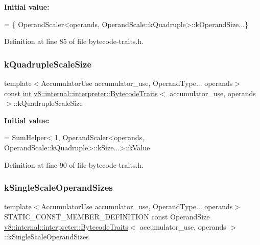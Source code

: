 {\bfseries Initial value\+:}
\begin{DoxyCode}
= \{
    OperandScaler<operands, OperandScale::kQuadruple>::kOperandSize...\}
\end{DoxyCode}


Definition at line 85 of file bytecode-\/traits.\+h.

\mbox{\label{structv8_1_1internal_1_1interpreter_1_1BytecodeTraits_a9e8702dbbdd38b628e7a21dd646c6747}} 
\subsubsection{\texorpdfstring{k\+Quadruple\+Scale\+Size}{kQuadrupleScaleSize}}
{\footnotesize\ttfamily template$<$Accumulator\+Use accumulator\+\_\+use, Operand\+Type... operands$>$ \\
const \mbox{\hyperlink{classint}{int}} \mbox{\hyperlink{structv8_1_1internal_1_1interpreter_1_1BytecodeTraits}{v8\+::internal\+::interpreter\+::\+Bytecode\+Traits}}$<$ accumulator\+\_\+use, operands $>$\+::k\+Quadruple\+Scale\+Size\hspace{0.3cm}{\ttfamily [static]}}

{\bfseries Initial value\+:}
\begin{DoxyCode}
= SumHelper<
      1, OperandScaler<operands, OperandScale::kQuadruple>::kSize...>::kValue
\end{DoxyCode}


Definition at line 90 of file bytecode-\/traits.\+h.

\mbox{\label{structv8_1_1internal_1_1interpreter_1_1BytecodeTraits_abcaf2b595c3970826dbe7abe30c7ebe6}} 
\subsubsection{\texorpdfstring{k\+Single\+Scale\+Operand\+Sizes}{kSingleScaleOperandSizes}}
{\footnotesize\ttfamily template$<$Accumulator\+Use accumulator\+\_\+use, Operand\+Type... operands$>$ \\
S\+T\+A\+T\+I\+C\+\_\+\+C\+O\+N\+S\+T\+\_\+\+M\+E\+M\+B\+E\+R\+\_\+\+D\+E\+F\+I\+N\+I\+T\+I\+ON const Operand\+Size \mbox{\hyperlink{structv8_1_1internal_1_1interpreter_1_1BytecodeTraits}{v8\+::internal\+::interpreter\+::\+Bytecode\+Traits}}$<$ accumulator\+\_\+use, operands $>$\+::k\+Single\+Scale\+Operand\+Sizes\hspace{0.3cm}{\ttfamily [static]}}

